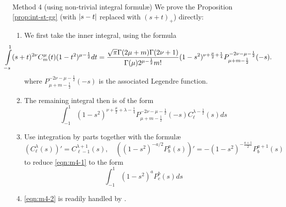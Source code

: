 \documentclass[pdf,notes]{beamer}
\begin{document}
\begin{frame}{Method 4 (using non-trivial integral formul\ae)}
	\scriptsize
	We prove the Proposition \ref{prop:int-st-gg} (with $\left|s-t\right|$ replaced with $(s+t)_+$) directly:
	\begin{enumerate}
		\item We first take the inner integral, using the formula \cite[7.4.11]{kobayashi2011schrodinger}
			{
				\scriptsize
			\begin{equation*}
				\kern-1cm\int_{-s}^1(s+t)^{2\nu} {C}_m^\mu(t)(1-t^2)^{\mu-\frac{1}{2}}dt=
				\frac{\sqrt{\pi}\Gamma(2\mu+m)\Gamma(2\nu+1)}{\Gamma(\mu)2^{\mu-\frac{1}{2}}m!}
				(1-s^2)^{\nu+\frac{\mu}{2}+\frac{1}{4}}P_{\mu+m-\frac{1}{2}}^{-2\nu-\mu-\frac{1}{2}}(-s).
			\end{equation*}
		}
			where $P_{\mu+m-\frac{1}{2}}^{-2\nu-\mu-\frac{1}{2}}(-s)$ is the associated Legendre function. 
		\item The remaining integral then is of the form\begin{equation}\label{eqn:m4-1}
				\int_{-1}^1(1-s^2)^{\nu+\frac{\mu}{2}+\lambda-\frac{1}{4}}P_{\mu+m-\frac{1}{2}}^{-2\nu-\mu-\frac{1}{2}}(-s)C^{\lambda-\frac{1}{2}}_\ell(s)ds
			\end{equation}
		\item Use integration by parts together with the formul\ae
			\begin{equation*}
				\left(C^\lambda_\ell(s)  \right)'=C^{\lambda+1}_{\ell-1}(s),\quad\left((1-s^2)^{-a/2}P^a_b(s) \right)'
			=-(1-s^2)^{-\frac{a+1}{2}}P_b^{a+1}(s)
			\end{equation*}
			to reduce \eqref{eqn:m4-1} to the form
			\begin{equation}\label{eqn:m4-2}
				\int_{-1}^1(1-s^2)^aP^b_c(s)ds
			\end{equation}
		\item \eqref{eqn:m4-2} is readily handled by \cite[L2]{kobayashi2011schrodinger}.
	\end{enumerate}
\end{frame}
\end{document}
